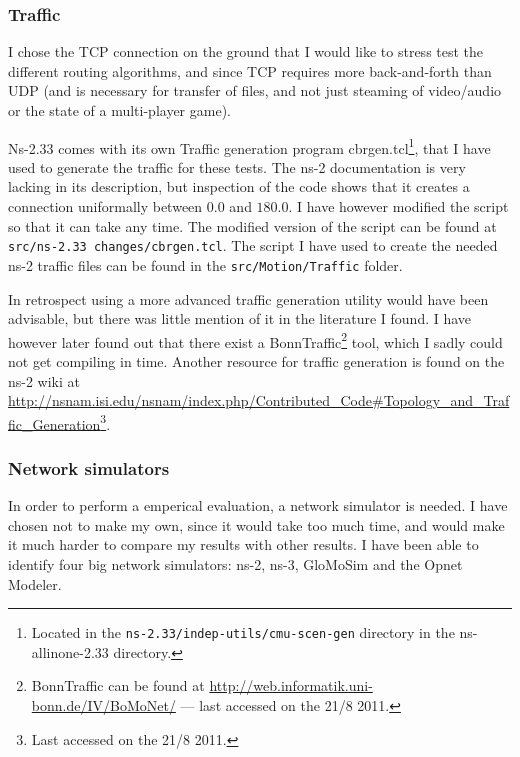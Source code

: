 \subsubsection{Traffic}
\label{section:traffic_model}
I chose the TCP connection on the ground that I would like to stress test the different routing algorithms, and since TCP requires more back-and-forth than UDP (and is necessary for transfer of files, and not just steaming of video/audio or the state of a multi-player game).

Ns-2.33 comes with its own Traffic generation program cbrgen.tcl\footnote{Located in the \texttt{ns-2.33/indep-utils/cmu-scen-gen} directory in the ns-allinone-2.33 directory.}, that I have used to generate the traffic for these tests. The ns-2 documentation is very lacking in its description, but inspection of the code shows that it creates a connection uniformally between $0.0$ and $180.0$. I have however modified the script so that it can take any time. The modified version of the script can be found at \texttt{src/ns-2.33 changes/cbrgen.tcl}. The script I have used to create the needed ns-2 traffic files can be found in the \texttt{src/Motion/Traffic} folder.

In retrospect using a more advanced traffic generation utility would have been advisable, but there was little mention of it in the literature I found. I have however later found out that there exist a BonnTraffic\footnote{BonnTraffic can be found at \url{http://web.informatik.uni-bonn.de/IV/BoMoNet/} --- last accessed on the 21/8 2011.} tool, which I sadly could not get compiling in time. Another resource for traffic generation is found on the ns-2 wiki at \url{http://nsnam.isi.edu/nsnam/index.php/Contributed_Code#Topology_and_Traffic_Generation}\footnote{Last accessed on the 21/8 2011.}.

\subsubsection{Network simulators}
\label{section:network_simulators}

In order to perform a emperical evaluation, a network simulator is needed. I have chosen not to make my own, since it would take too much time, and would make it much harder to compare my results with other results. I have been able to identify four big network simulators: ns-2, ns-3, GloMoSim and the Opnet Modeler.

